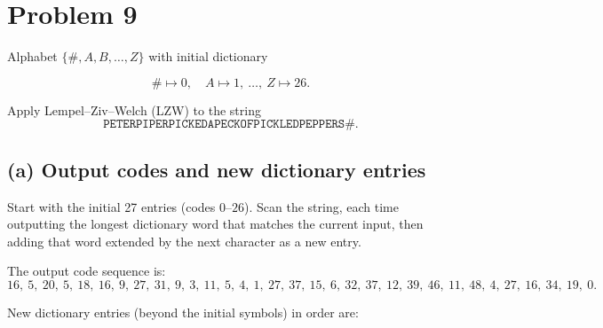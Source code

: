 \section*{Problem 9}

Alphabet \(\{ \#,A,B,\ldots,Z\}\) with initial dictionary

\[
\#\mapsto 0,\quad A\mapsto 1,\ \ldots,\ Z\mapsto 26.
\]

Apply Lempel–Ziv–Welch (LZW) to the string
\[
\texttt{PETERPIPERPICKEDAPECKOFPICKLEDPEPPERS\#}.
\]

\subsection*{(a) Output codes and new dictionary entries}

Start with the initial 27 entries (codes \(0\)–\(26\)).
Scan the string, each time outputting the longest dictionary word that
matches the current input, then adding that word extended by the next
character as a new entry.

The output code sequence is:
\[
\boxed{16,\ 5,\ 20,\ 5,\ 18,\ 16,\ 9,\ 27,\ 31,\ 9,\ 3,\ 11,\ 5,\ 4,\ 1,\ 27,\ 37,\ 15,\ 6,\ 32,\ 37,\ 12,\ 39,\ 46,\ 11,\ 48,\ 4,\ 27,\ 16,\ 34,\ 19,\ 0}.
\]

New dictionary entries (beyond the initial symbols) in order are:

